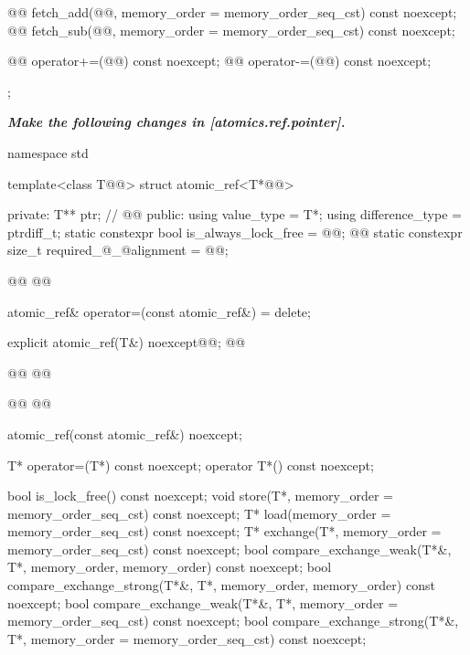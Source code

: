 \begin{codeblock}
{{    @@ fetch_add(@@,
                             memory_order = memory_order_seq_cst) const noexcept;
    @@ fetch_sub(@@,
                             memory_order = memory_order_seq_cst) const noexcept;

    @@ operator+=(@@) const noexcept;
    @@ operator-=(@@) const noexcept;
  };
}
\end{codeblock}

\textbf{\textit{Make the following changes in [atomics.ref.pointer].}} \\

\begin{codeblock}
namespace std {
  template<class T@@> struct atomic_ref<T*@@> {
  private:
    T** ptr;              // \expos
    @@
  public:
    using value_type = T*;
    using difference_type = ptrdiff_t;
    static constexpr bool is_always_lock_free = @@;
    @@
    static constexpr size_t required_@_@alignment = @@;

    @@
    @@

    atomic_ref& operator=(const atomic_ref&) = delete;

    explicit atomic_ref(T&) noexcept@@;
    @@
   
    @@
    @@
    
    @@
    @@

    atomic_ref(const atomic_ref&) noexcept;

    T* operator=(T*) const noexcept;
    operator T*() const noexcept;

    bool is_lock_free() const noexcept;
    void store(T*, memory_order = memory_order_seq_cst) const noexcept;
    T* load(memory_order = memory_order_seq_cst) const noexcept;
    T* exchange(T*, memory_order = memory_order_seq_cst) const noexcept;
    bool compare_exchange_weak(T*&, T*,
                               memory_order, memory_order) const noexcept;
    bool compare_exchange_strong(T*&, T*,
                                 memory_order, memory_order) const noexcept;
    bool compare_exchange_weak(T*&, T*,
                               memory_order = memory_order_seq_cst) const noexcept;
    bool compare_exchange_strong(T*&, T*,
                                 memory_order = memory_order_seq_cst) const noexcept;

}}
\end{codeblock}
